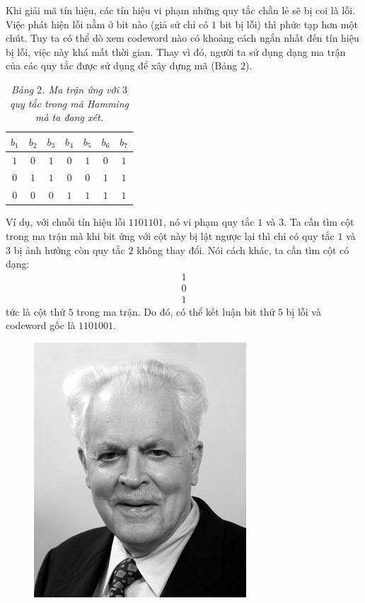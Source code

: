 \begin{multicols}{2}
	Khi giải mã tín hiệu, các tín hiệu vi phạm những quy tắc chẵn lẻ sẽ bị coi là lỗi. Việc phát hiện lỗi nằm ở bit nào (giả sử chỉ có $1$ bit bị lỗi) thì phức tạp hơn một chút. Tuy ta có thể dò xem codeword nào có khoảng cách ngắn nhất đến tín hiệu bị lỗi, việc này khá mất thời gian. Thay vì đó, người ta sử dụng dạng ma trận của các quy tắc được sử dụng để xây dựng mã (Bảng $2$).
	\begin{table}[H]
		\vspace*{-5pt}
		\centering
		\captionsetup{labelformat= empty, justification=centering}
		\begin{tabular}{ccccccc}
			\hline
			$b_1$ & $b_2$& $b_3$& $b_4$&$b_5$ &$b_6$ &$b_7$\\
			\hline
			$1$ & $0$&$1$&$0$&$1$&$0$&$1$\\
			$0$ & $1$&$1$&$0$&$0$&$1$&$1$\\
			$0$ & $0$&$0$&$1$&$1$&$1$&$1$\\
		\end{tabular}	
		\caption{\small\textit{\color{toanhocdoisong}Bảng $2$. Ma trận ứng với $3$ quy tắc trong mã Hamming mà ta đang xét.}}
		\vspace*{-10pt}
	\end{table}
	Ví dụ, với chuỗi tín hiệu lỗi $1101101$, nó vi phạm quy tắc $1$ và $3$. Ta cần tìm cột trong ma trận mà khi bit ứng với cột này bị lật ngược lại thì chỉ có quy tắc $1$ và $3$ bị ảnh hưởng còn quy tắc $2$ không thay đổi. Nói cách khác, ta cần tìm cột có dạng:
	\begin{align*}
		1\\[-0.5ex]
		0\\[-0.5ex]
		1
	\end{align*}
	tức là cột thứ $5$ trong ma trận. Do đó, có thể kết luận bit thứ $5$ bị lỗi và codeword gốc là $1101001$.
		\begin{figure}[H]
		\vspace*{-5pt}
		\centering
		\captionsetup{labelformat= empty, justification=centering}
		\includegraphics[height= 0.575\linewidth]{2}

\end{figure}
\end{multicols}
